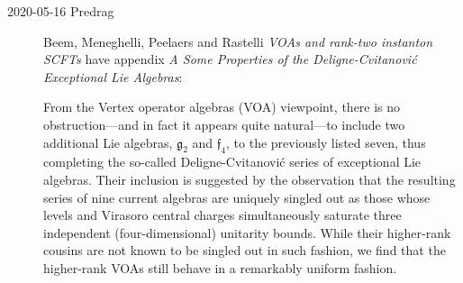\begin{description}
\item[2020-05-16 Predrag]
Beem, Meneghelli, Peelaers and Rastelli
{\em {VOAs} and rank-two instanton {SCFTs}}
have appendix {\em A Some Properties of the Deligne-Cvitanovi\'c
Exceptional Lie Algebras}:

From the Vertex operator algebras (VOA) viewpoint, there is no
obstruction---and in fact it appears quite natural---to include two
additional Lie algebras, $\mathfrak{g}_2$ and $\mathfrak{f}_4$, to the
previously listed seven, thus completing the so-called
Deligne-Cvitanovi\'c series of exceptional Lie algebras.
Their inclusion is suggested by the observation that the resulting series
of nine current algebras are uniquely singled out as those whose levels
and Virasoro central charges simultaneously saturate three independent
(four-dimensional) unitarity bounds. While their higher-rank cousins are
not known to be singled out in such fashion, we find that the higher-rank
VOAs still behave in a remarkably uniform fashion.



\end{description}
\renewcommand{\ssp}{a}


\printbibliography[heading=subbibintoc,title={References}]

